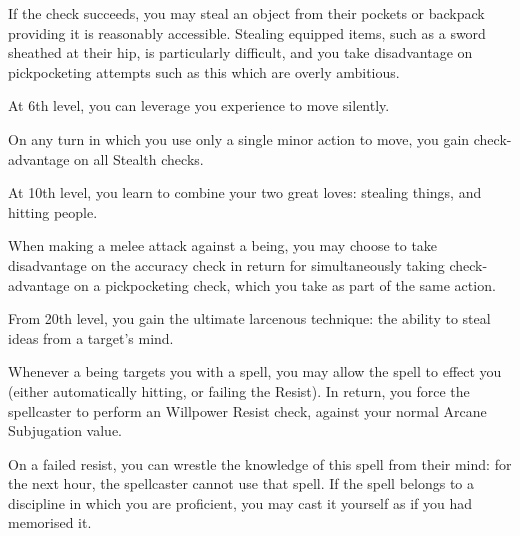 If the check succeeds, you may steal an object from their pockets or backpack \minus{} providing it is reasonably accessible. Stealing equipped items, such as a sword sheathed at their hip, is particularly difficult, and you take disadvantage on pickpocketing attempts such as this which are overly ambitious.   




At 6th level, you can leverage you experience to move silently. 

On any turn in which you use only a single minor action to move, you gain check-advantage on all Stealth checks. 


At 10th level, you learn to combine your two great loves: stealing things, and hitting people. 

When making a melee attack against a being, you may choose to take disadvantage on the accuracy check in return for simultaneously taking check-advantage on a pickpocketing check, which you take as part of the same action.




From 20th level, you gain the ultimate larcenous technique: the ability to steal ideas from a target's mind.

Whenever a being targets you with a spell, you may allow the spell to effect you (either automatically hitting, or failing the Resist). In return, you force the spellcaster to perform an Willpower Resist check, against your normal Arcane Subjugation value. 

On a failed resist, you can wrestle the knowledge of this spell from their mind: for the next hour, the spellcaster cannot use that spell. If the spell belongs to a discipline in which you are proficient, you may cast it yourself as if you had memorised it.  


